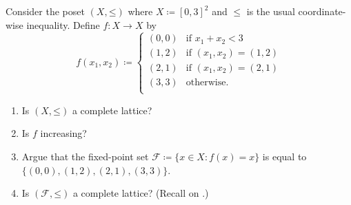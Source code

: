 \begin{exercise}[{\cite[pp.~40--41]{Topkis1998}}]
	\label{exercise:diamond_tarski}
	Consider the poset $(X,\mathord{\leq})$ where $X \coloneqq [0,3]^2$ and $\leq$ is the usual coordinate-wise inequality. Define $f : X \to X$ by
	\begin{equation*}
		f(x_1,x_2) \coloneqq
		\begin{cases}
			(0,0) & \text{if $x_1+x_2<3$} \\
			(1,2) & \text{if $(x_1,x_2)=(1,2)$} \\
			(2,1) & \text{if $(x_1,x_2)=(2,1)$} \\
			(3,3) & \text{otherwise.} \\
		\end{cases}
	\end{equation*}

	\begin{enumerate}[label=(\alph*)]

		\item Is $(X,\mathord{\leq})$ a complete lattice?
	
		\item Is $f$ increasing?

		\item Argue that the fixed-point set $\mathcal{F} \coloneqq \{ x \in X : f(x)=x \}$ is equal to $\{ (0,0), (1,2), (2,1), (3,3) \}$.

		\item Is $(\mathcal{F},\mathord{\leq})$ a complete lattice? (Recall  on .) 
	
	\end{enumerate}
\end{exercise}

